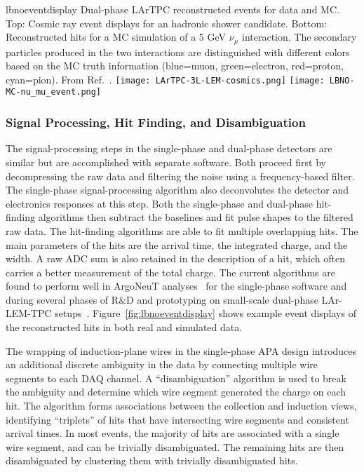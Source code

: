 \begin{cdrfigure}{lbnoeventdisplay}
{
Dual-phase LArTPC reconstructed events for data and MC.
Top: Cosmic ray event displays for an hadronic shower candidate.
Bottom: Reconstructed hits for a MC simulation of a 5 GeV $\nu_{\mu}$ interaction.
The secondary particles produced in the two interactions are 
distinguished with different colors based on the MC truth information (blue=muon, green=electron, red=proton, cyan=pion).
From Ref.~\cite{Badertscher:2012dq}.
}
\texttt{[image: LArTPC-3L-LEM-cosmics.png]}
\texttt{[image: LBNO-MC-nu\_mu\_event.png]}
\end{cdrfigure}

\subsubsection{Signal Processing, Hit Finding, and Disambiguation}

The signal-processing steps in the single-phase and dual-phase detectors are similar but
are accomplished with separate software.  Both proceed first by decompressing the raw data
and filtering the noise using a frequency-based filter.  The single-phase signal-processing
algorithm also deconvolutes the detector and electronics responses at this step.
Both the single-phase and dual-phase hit-finding algorithms then subtract the baselines
and fit pulse shapes to the filtered raw data.  The hit-finding algorithms are able to
fit multiple overlapping hits.  The main parameters of the hits are the arrival time, the
integrated charge, and the width.  A raw ADC sum is also retained in the description of a hit, which
often carries a better measurement of the total charge.
The current algorithms are found to perform well in 
ArgoNeuT analyses~\cite{Anderson:2012vc} for the single-phase software and during several phases 
of R$\&$D and prototyping on small-scale dual-phase LAr-LEM-TPC 
setups~\cite{Badertscher:2008rf,Badertscher:2012dq}.
Figure~\ref{fig:lbnoeventdisplay} shows example event displays of the reconstructed hits 
in both real and simulated data. 

The wrapping of induction-plane wires in the single-phase APA design
introduces an additional discrete ambiguity in the data by connecting multiple wire
segments to each DAQ channel. A ``disambiguation'' algorithm is used to break the
ambiguity and determine which wire segment generated the charge on each hit.
The algorithm forms associations between the collection and induction views,
identifying ``triplets'' of hits that have intersecting wire segments
and consistent arrival times. In most events, the majority of hits are
associated with a single wire segment, and can be trivially disambiguated.
The remaining hits are then disambiguated by clustering them with trivially disambiguated hits.

